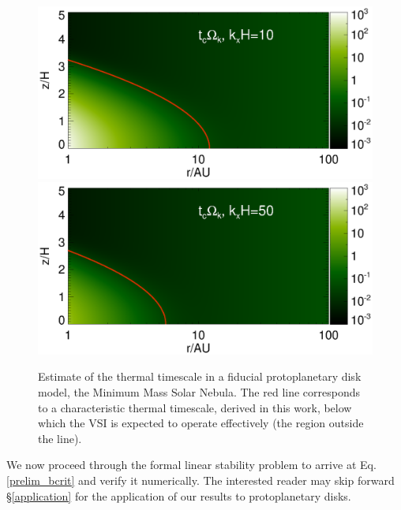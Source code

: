 \documentclass[iop]{emulateapj}
\begin{document}
\begin{figure}
  \includegraphics[width=\linewidth,clip=true,trim=0cm 1.7cm 0cm
  0.73cm]{figures/bcrit_mmsn2d_kx10}
  \includegraphics[width=\linewidth,clip=true,trim=0cm 0.46cm 0cm
  0.73cm]{figures/bcrit_mmsn2d_kx50}
  \caption{Estimate of the thermal timescale  in a fiducial 
    protoplanetary disk model, the Minimum Mass Solar Nebula. The red
    line corresponds to a characteristic thermal timescale, derived in
    this work, below which the VSI is expected to operate effectively
    (the region outside the line).    
    \label{bcrit_mmsn2d} 
  }
\end{figure}

We now proceed through the formal linear stability problem to arrive
at Eq. \ref{prelim_bcrit} and verify it numerically. The interested 
reader may skip forward \S\ref{application} for the application of our
results to protoplanetary disks.     





 


\appendix




\end{document}

